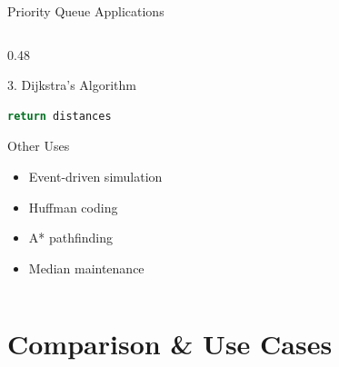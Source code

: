 \documentclass[aspectratio=169,xcolor=dvipsnames]{beamer}
\begin{document}
\begin{frame}[fragile]{Priority Queue Applications}
\begin{columns}
\begin{column}{0.48\textwidth}
\begin{exampleblock}{3. Dijkstra's Algorithm}
\begin{lstlisting}[language=Python,basicstyle=\tiny\ttfamily]
    return distances
        \end{lstlisting}
      \end{exampleblock}

      \begin{block}{Other Uses}
        \begin{itemize}
          \item Event-driven simulation
          \item Huffman coding
          \item A* pathfinding
          \item Median maintenance
        \end{itemize}
      \end{block}
    \end{column}
  \end{columns}
\end{frame}

\section{Comparison \& Use Cases}
\end{document}
